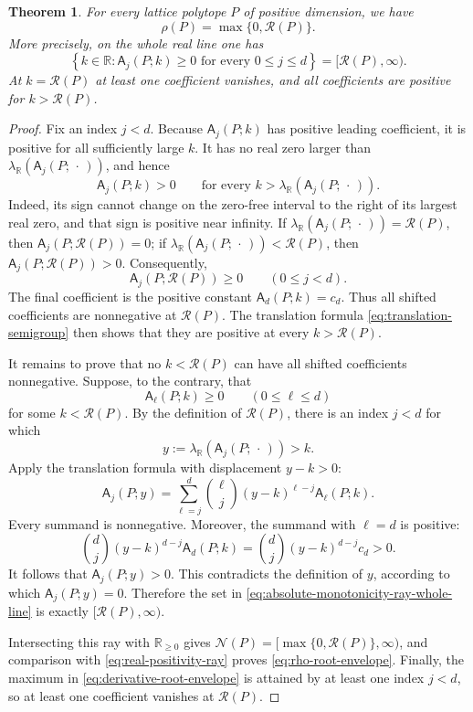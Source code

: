 \documentclass[reqno, 12pt]{article}
\numberwithin{equation}{section}
\newtheorem{theorem}{Theorem}[section]
\theoremstyle{definition}
\newcommand{\R}{\mathbb{R}}
\newcommand{\A}{\mathsf{A}}
\begin{document}
\begin{theorem}\label{thm:root-envelope}
For every lattice polytope $P$ of positive dimension, we have 
\begin{equation}\label{eq:rho-root-envelope}
\rho(P)=\max\{0,\mathcal R(P)\}.
\end{equation}
More precisely, on the whole real line one has
\begin{equation}\label{eq:absolute-monotonicity-ray-whole-line}
\left\{k\in\R:\A_j(P;k)\geq0\text{ for every }0\leq j\leq d\right\}=[\mathcal R(P),\infty).
\end{equation}
At $k=\mathcal R(P)$ at least one coefficient vanishes, and all coefficients are positive for $k>\mathcal R(P)$.
\end{theorem}
\begin{proof}
Fix an index $j<d$.  Because $\A_j(P;k)$ has positive leading coefficient, it is positive for all
sufficiently large $k$.  It has no real zero larger than $\lambda_{\R}(\A_j(P;\,\cdot\,))$, and hence
\[\A_j(P;k)>0\qquad\text{for every }k>\lambda_{\R}(\A_j(P;\,\cdot\,)).
\]
Indeed, its sign cannot change on the zero-free interval to the right of its largest real zero, and that sign is positive near infinity.  If
$\lambda_{\R}(\A_j(P;\,\cdot\,))=\mathcal R(P)$, then $\A_j(P;\mathcal R(P))=0$; if
$\lambda_{\R}(\A_j(P;\,\cdot\,))<\mathcal R(P)$, then $\A_j(P;\mathcal R(P))>0$.  Consequently,
\[\A_j(P;\mathcal R(P))\geq0\qquad(0\leq j<d).\]
The final coefficient is the positive constant $\A_d(P;k)=c_d$.  Thus all shifted coefficients are nonnegative at $\mathcal R(P)$.  The translation formula \eqref{eq:translation-semigroup} then shows that they are positive at every $k>\mathcal R(P)$.

It remains to prove that no $k<\mathcal R(P)$ can have all shifted coefficients nonnegative.  Suppose, to the contrary, that
\[\A_\ell(P;k)\geq0\qquad(0\leq\ell\leq d)
\]
for some $k<\mathcal R(P)$.  By the definition of $\mathcal R(P)$, there is an index $j<d$ for which
\[y:=\lambda_{\R}(\A_j(P;\,\cdot\,))>k.
\]
Apply the translation formula with displacement $y-k>0$:
\[\A_j(P;y)=\sum_{\ell=j}^{d}\binom{\ell}{j}(y-k)^{\ell-j}\A_\ell(P;k).
\]
Every summand is nonnegative.  Moreover, the summand with $\ell=d$ is positive:
\[\binom{d}{j}(y-k)^{d-j}\A_d(P;k)=\binom{d}{j}(y-k)^{d-j}c_d>0.
\]
It follows that $\A_j(P;y)>0$.  This contradicts the definition of $y$, according to which $\A_j(P;y)=0$.  Therefore the set in
\eqref{eq:absolute-monotonicity-ray-whole-line} is exactly $[\mathcal R(P),\infty)$.

Intersecting this ray with $\R_{\geq0}$ gives $\mathcal N(P)=[\max\{0,\mathcal R(P)\},\infty)$, and comparison with \eqref{eq:real-positivity-ray} proves \eqref{eq:rho-root-envelope}.  Finally, the maximum in
\eqref{eq:derivative-root-envelope} is attained by at least one index $j<d$, so at least one coefficient vanishes at $\mathcal R(P)$.
\end{proof}
\end{document}
